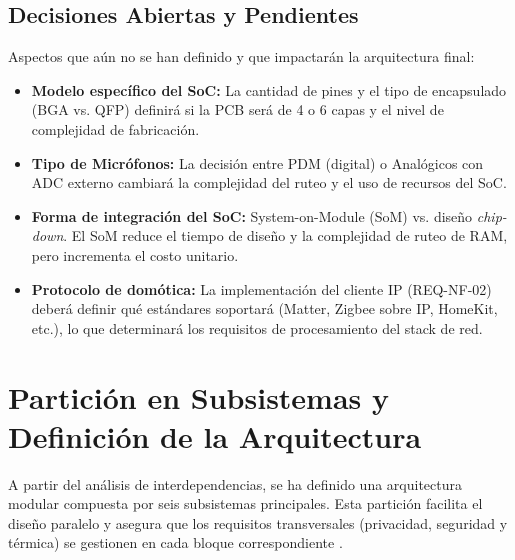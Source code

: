 \documentclass[%
	paper=a4,
	twoside=false,
	parskip=half,
	chapterprefix=false,
	10pt,
	headings=normal,
	bibliography=totoc,
	listof=totoc,
	titlepage=on,
	captions=tableabove,
	draft=false, 
]{scrbook}%
\begin{document}
\section{Decisiones Abiertas y Pendientes}

Aspectos que aún no se han definido y que impactarán la arquitectura final:

\begin{itemize}
    \item \textbf{Modelo específico del SoC:} La cantidad de pines y el tipo de encapsulado (BGA vs. QFP) definirá si la PCB será de 4 o 6 capas y el nivel de complejidad de fabricación.
    \item \textbf{Tipo de Micrófonos:} La decisión entre PDM (digital) o Analógicos con ADC externo cambiará la complejidad del ruteo y el uso de recursos del SoC.
    \item \textbf{Forma de integración del SoC:} System-on-Module (SoM) vs. diseño \textit{chip-down}. El SoM reduce el tiempo de diseño y la complejidad de ruteo de RAM, pero incrementa el costo unitario.
    \item \textbf{Protocolo de domótica:} La implementación del cliente IP (REQ-NF-02) deberá definir qué estándares soportará (Matter, Zigbee sobre IP, HomeKit, etc.), lo que determinará los requisitos de procesamiento del stack de red.
\end{itemize}

\chapter{Partición en Subsistemas y Definición de la Arquitectura}
\label{chap:subsistemas}

A partir del análisis de interdependencias, se ha definido una arquitectura modular compuesta por seis subsistemas principales. Esta partición facilita el diseño paralelo y asegura que los requisitos transversales (privacidad, seguridad y térmica) se gestionen en cada bloque correspondiente \cite{guia_entregable2}.
\end{document}
